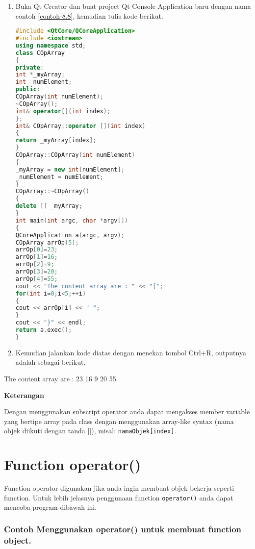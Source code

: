 \begin{enumerate}

\item
  Buka Qt Creator dan buat project Qt Console Application baru dengan
  nama contoh \ref{contoh-8.8}, kemudian tulis kode berikut.

\begin{lstlisting}[language=c++, caption=Subscript Operator untuk Dynamic Array, label=contoh-8.8]
#include <QtCore/QCoreApplication>
#include <iostream>
using namespace std;
class COpArray
{
private:
int *_myArray;
int _numElement;
public:
COpArray(int numElement);
~COpArray();
int& operator[](int index);
};
int& COpArray::operator [](int index)
{
return _myArray[index];
}
COpArray::COpArray(int numElement)
{
_myArray = new int[numElement];
_numElement = numElement;
}
COpArray::~COpArray()
{
delete [] _myArray;
}
int main(int argc, char *argv[])
{
QCoreApplication a(argc, argv);
COpArray arrOp(5);
arrOp[0]=23;
arrOp[1]=16;
arrOp[2]=9;
arrOp[3]=20;
arrOp[4]=55;
cout << "The content array are : " << "{";
for(int i=0;i<5;++i)
{
cout << arrOp[i] << " ";
}
cout << "}" << endl;
return a.exec();
}
\end{lstlisting}
\item
  Kemudian jalankan kode diatas dengan menekan tombol Ctrl+R, outputnya
  adalah sebagai berikut.
\end{enumerate}

\begin{lcverbatim}
The content array are : {23 16 9 20 55 }
\end{lcverbatim}

\textbf{Keterangan}

Dengan menggunakan subscript operator anda dapat mengakses member
variable yang bertipe array pada class dengan menggunakan array-like
syntax (nama objek diikuti dengan tanda {[}{]}), misal:
\texttt{namaObjek{[}index{]}}.

\section{Function operator()}\label{function-operator}

Function operator digunakan jika anda ingin membuat objek bekerja
seperti function. Untuk lebih jelasnya penggunaan function
\texttt{operator()} anda dapat mencoba program dibawah ini.

\subsubsection*{Contoh  Menggunakan operator() untuk membuat function object.}

